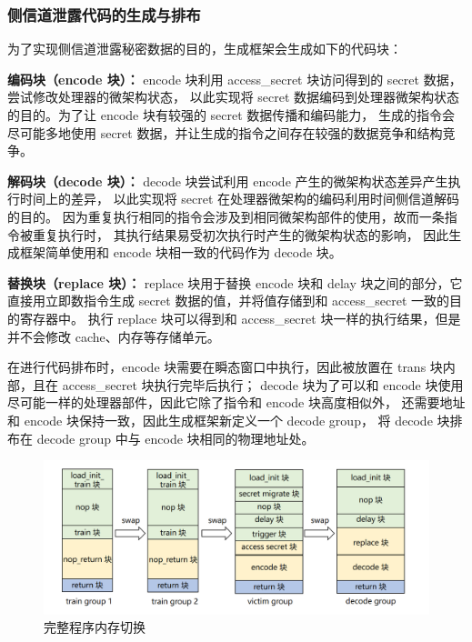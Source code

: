 \subsubsection{侧信道泄露代码的生成与排布}

为了实现侧信道泄露秘密数据的目的，生成框架会生成如下的代码块：\par

\textbf{编码块（encode 块）：}
encode 块利用 access\_secret 块访问得到的 secret 数据，尝试修改处理器的微架构状态，
以此实现将 secret 数据编码到处理器微架构状态的目的。为了让 encode 块有较强的 secret 数据传播和编码能力，
生成的指令会尽可能多地使用 secret 数据，并让生成的指令之间存在较强的数据竞争和结构竞争。\par

\textbf{解码块（decode 块）：}
decode 块尝试利用 encode 产生的微架构状态差异产生执行时间上的差异，
以此实现将 secret 在处理器微架构的编码利用时间侧信道解码的目的。
因为重复执行相同的指令会涉及到相同微架构部件的使用，故而一条指令被重复执行时，
其执行结果易受初次执行时产生的微架构状态的影响，
因此生成框架简单使用和 encode 块相一致的代码作为 decode 块。\par

\textbf{替换块（replace 块）：}
replace 块用于替换 encode 块和 delay 块之间的部分，它直接用立即数指令生成 secret 数据的值，并将值存储到和 access\_secret 一致的目的寄存器中。
执行 replace 块可以得到和 access\_secret 块一样的执行结果，但是并不会修改 cache、内存等存储单元。

在进行代码排布时，encode 块需要在瞬态窗口中执行，因此被放置在 trans 块内部，且在 access\_secret 块执行完毕后执行；
decode 块为了可以和 encode 块使用尽可能一样的处理器部件，因此它除了指令和 encode 块高度相似外，
还需要地址和 encode 块保持一致，因此生成框架新定义一个 decode group，
将 decode 块排布在 decode group 中与 encode 块相同的物理地址处。\par

\begin{figure}[!h]
    \centering
    \includegraphics[width=\linewidth]{figure/paper/group-switch-all.png}
    \caption{完整程序内存切换}
    \label{paper:group-switch-all}
\end{figure}

